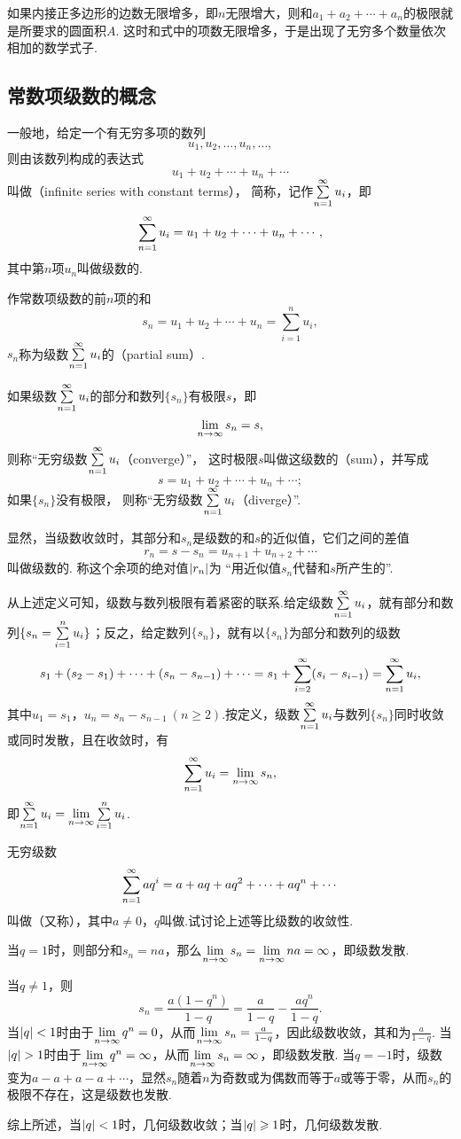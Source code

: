 如果内接正多边形的边数无限增多，即\(n\)无限增大，则和\(a_1+a_2+\dotsb+a_n\)的极限就是所要求的圆面积\(A\).
这时和式中的项数无限增多，于是出现了无穷多个数量依次相加的数学式子.

\subsection{常数项级数的概念}
\begin{definition}\label{definition:无穷级数.常数项级数的定义}
一般地，给定一个有无穷多项的数列\[
u_1,u_2,\dotsc,u_n,\dotsc,
\]则由该数列构成的表达式\[
u_1+u_2+\dotsb+u_n+\dotsb
\]叫做（infinite series with constant terms），%
简称，记作\(\sum\limits_{n=1}^\infty u_i\)，即\[
\sum\limits_{n=1}^\infty u_i
= u_1+u_2+\dotsb+u_n+\dotsb,
\]
其中第\(n\)项\(u_n\)叫做级数的.

作常数项级数的前\(n\)项的和\[
s_n = u_1+u_2+\dotsb+u_n = \sum\limits_{i=1}^n{u_i},
\]\(s_n\)称为级数\(\sum\limits_{n=1}^\infty u_i\)的（partial sum）.

如果级数\(\sum\limits_{n=1}^\infty u_i\)的部分和数列\(\{s_n\}\)有极限\(s\)，即\[
\lim\limits_{n\to\infty} s_n = s,
\]则称“无穷级数\(\sum\limits_{n=1}^\infty u_i\)（converge）”，%
这时极限\(s\)叫做这级数的（sum），并写成\[
s = u_1+u_2+\dotsb+u_n+\dotsb;
\]如果\(\{s_n\}\)没有极限，%
则称“无穷级数\(\sum\limits_{n=1}^\infty u_i\)（diverge）”.

显然，当级数收敛时，其部分和\(s_n\)是级数的和\(s\)的近似值，它们之间的差值\[
r_n = s - s_n = u_{n+1}+u_{n+2}+\dotsb
\]叫做级数的.
称这个余项的绝对值\(\abs{r_n}\)为%
“用近似值\(s_n\)代替和\(s\)所产生的”.
\end{definition}
从上述定义可知，级数与数列极限有着紧密的联系.给定级数\(\sum\limits_{n=1}^\infty u_i\)，就有部分和数列\(\{s_n = \sum\limits_{i=1}^n u_i\}\)；反之，给定数列\(\{s_n\}\)，就有以\(\{s_n\}\)为部分和数列的级数\[
s_1 + (s_2-s_1) + \dotsb + (s_n-s_{n-1}) + \dotsb
= s_1 + \sum\limits_{i=2}^\infty (s_i-s_{i-1})
= \sum\limits_{n=1}^\infty u_i,
\]其中\(u_1=s_1\)，\(u_n=s_n-s_{n-1}\ (n \geqslant 2)\).按定义，级数\(\sum\limits_{n=1}^\infty u_i\)与数列\(\{s_n\}\)同时收敛或同时发散，且在收敛时，有\[
\sum\limits_{n=1}^\infty u_i = \lim\limits_{n\to\infty} s_n,
\]即\(\sum\limits_{n=1}^\infty u_i = \lim\limits_{n\to\infty} \sum\limits_{i=1}^n u_i\).

\begin{example}\label{example:无穷级数.等比级数的收敛性}
无穷级数\[
\sum\limits_{n=1}^\infty a q^i = a+aq+aq^2+\dotsb+aq^n+\dotsb
\]叫做（又称），其中\(a \neq 0\)，\(q\)叫做.试讨论上述等比级数的收敛性.
\begin{solution}
当\(q = 1\)时，则部分和\(s_n=na\)，那么\(\lim\limits_{n\to\infty} s_n = \lim\limits_{n\to\infty} na = \infty\)，即级数发散.

当\(q \neq 1\)，则\[
s_n = \frac{a(1-q^n)}{1-q} = \frac{a}{1-q} - \frac{aq^n}{1-q}.
\]
当\(\abs{q} < 1\)时由于\(\lim\limits_{n\to\infty} q^n=0\)，从而\(\lim\limits_{n\to\infty} s_n=\frac{a}{1-q}\)，因此级数收敛，其和为\(\frac{a}{1-q}\).
当\(\abs{q} > 1\)时由于\(\lim\limits_{n\to\infty} q^n=\infty\)，从而\(\lim\limits_{n\to\infty} s_n=\infty\)，即级数发散.
当\(q = -1\)时，级数变为\(a-a+a-a+\dotsb\)，显然\(s_n\)随着\(n\)为奇数或为偶数而等于\(a\)或等于零，从而\(s_n\)的极限不存在，这是级数也发散.

综上所述，{\color{red}当\(\abs{q} < 1\)时，几何级数收敛；当\(\abs{q} \geqslant 1\)时，几何级数发散.}
\end{solution}
\end{example}

